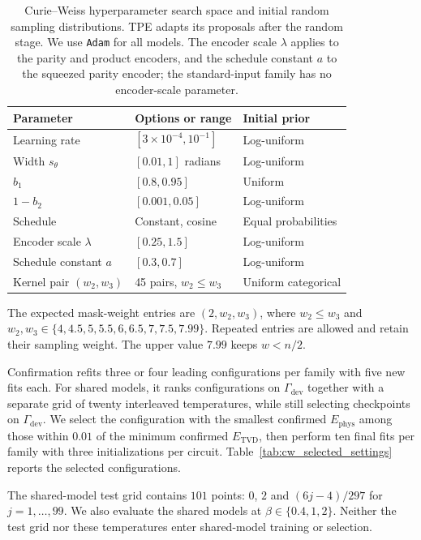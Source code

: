 \documentclass[pra,aps,10pt,twocolumn,floatfix,superscriptaddress, notitlepage,longbibliography]{revtex4-2}
\begin{document}
\begin{table}[!htbp]
\centering
\caption{Curie--Weiss hyperparameter search space and initial random sampling distributions. TPE adapts its proposals after the random stage. We use \texttt{Adam} for all models. The encoder scale $\lambda$ applies to the parity and product encoders, and the schedule constant $a$ to the squeezed parity encoder; the standard-input family has no encoder-scale parameter.}
\label{tab:cw_hpo_ranges}
\label{tab:cw_full_tvd_hpo_ranges}
\small
\begin{tabular}{lll}
\toprule
Parameter & Options or range & Initial prior \\
\midrule
Learning rate & $[3\times10^{-4},10^{-1}]$ & Log-uniform \\
Width $s_\theta$ & $[0.01,1]$ radians & Log-uniform \\
$b_1$ & $[0.8,0.95]$ & Uniform \\
$1-b_2$ & $[0.001,0.05]$ & Log-uniform \\
Schedule & Constant, cosine & Equal probabilities \\
Encoder scale $\lambda$ & $[0.25,1.5]$ & Log-uniform \\
Schedule constant $a$ & $[0.3,0.7]$ & Log-uniform \\
Kernel pair $(w_2,w_3)$ & 45 pairs, $w_2\leq w_3$ & Uniform categorical \\
\bottomrule
\end{tabular}
\par\smallskip
\parbox{\columnwidth}{The expected mask-weight entries are $(2,w_2,w_3)$, where $w_2\leq w_3$ and $w_2,w_3\in\{4,4.5,5,5.5,6,6.5,7,7.5,7.99\}$. Repeated entries are allowed and retain their sampling weight. The upper value $7.99$ keeps $w<n/2$.}
\end{table}

Confirmation refits three or four leading configurations per family with five new fits each. For shared models, it ranks configurations on $\Gamma_{\mathrm{dev}}$ together with a separate grid of twenty interleaved temperatures, while still selecting checkpoints on $\Gamma_{\mathrm{dev}}$. We select the configuration with the smallest confirmed $E_{\mathrm{phys}}$ among those within $0.01$ of the minimum confirmed $E_{\mathrm{TVD}}$, then perform ten final fits per family with three initializations per circuit. Table~\ref{tab:cw_selected_settings} reports the selected configurations.

The shared-model test grid contains $101$ points: $0$, $2$ and $(6j-4)/297$ for $j=1,\ldots,99$. We also evaluate the shared models at $\beta\in\{0.4,1,2\}$. Neither the test grid nor these temperatures enter shared-model training or selection.
\end{document}

